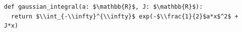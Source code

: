 \documentclass[border=10pt]{standalone}
\begin{document}
\begin{lstlisting}
def gaussian_integral(a: $\mathbb{R}$, J: $\mathbb{R}$):
  return $\\int_{-\\infty}^{\\infty}$ exp(-$\\frac{1}{2}$a*x$^2$ + J*x)
\end{lstlisting}
\end{document}
